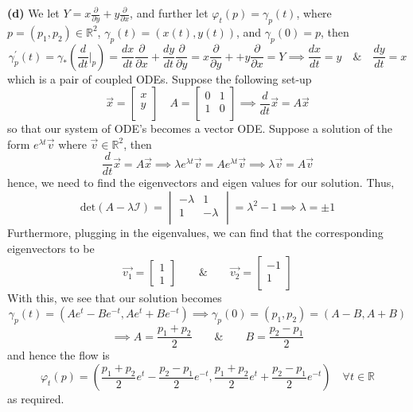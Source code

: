 \documentclass[10pt]{article}
\newcommand{\R}{\mathbb{R}}
\newcommand{\di}[2][]{\frac{\partial #1}{\partial #2}}
\newcommand{\del}[2][]{\frac{d #1}{d #2}}
\begin{document}
\textbf{(d)} We let $Y = x\di{y} + y\di{x}$, and further let $\varphi_{t}(p) = \gamma_{p}(t)$, where $p=(p_{1},p_{2})\in \R^{2}$, $\gamma_{p}(t) = (x(t),y(t))$, and $\gamma_{p}(0) = p$, then
\[ \gamma^{\prime}_{p}(t) = \gamma_{*}\left(\del{t}\bigg|_{p}\right) = \del[x]{t}\di{x} + \del[y]{t}\di{y} = x\di{y} + +y\di{x} = Y \implies \del[x]{t} = y \hspace{1em} \& \hspace{1em} \del[y]{t} = x \]
which is a pair of coupled ODEs. Suppose the following set-up
\[ \vec{x} = 
\begin{bmatrix}
  x \\
  y \\
\end{bmatrix}
\hspace{1em}
A =
\begin{bmatrix}
  0 & 1 \\
  1 & 0 \\
\end{bmatrix}
\implies \del{t}\vec{x} = A\vec{x}
\]
so that our system of ODE's becomes a vector ODE. Suppose a solution of the form $e^{\lambda t}\vec{v}$ where $\vec{v}\in \R^{2}$, then
\[ \del{t}\vec{x} = A\vec{x} \implies \lambda e^{\lambda t}\vec{v} = Ae^{\lambda t}\vec{v} \implies  \lambda \vec{v}= A\vec{v} \]
hence, we need to find the eigenvectors and eigen values for our solution. Thus,
\[ \text{det}(A - \lambda \mathcal{I}) =
\begin{vmatrix}
  -\lambda & 1 \\
  1 & -\lambda \\
\end{vmatrix}
= \lambda^{2} - 1 \implies \lambda = \pm 1 
\]
Furthermore, plugging in the eigenvalues, we can find that the corresponding eigenvectors to be
\[ \vec{v_{1}} = 
\begin{bmatrix}
  1 \\
  1
\end{bmatrix}
\hspace{2em} \& \hspace{2em} \vec{v_{2}} =
\begin{bmatrix}
  -1 \\
  1 \\
\end{bmatrix}
\]
With this, we see that our solution becomes
\[ \gamma_{p}(t) = (Ae^{t} - Be^{-t}, Ae^{t} + Be^{-t}) \implies \gamma_{p}(0) = (p_{1},p_{2}) = (A-B,A+B) \]
\[ \implies A = \frac{p_{1}+p_{2}}{2} \hspace{2em} \& \hspace{2em} B = \frac{p_{2} - p_{1}}{2} \]
and hence the flow is
\[ \varphi_{t}(p) = \left(\frac{p_{1}+p_{2}}{2}e^{t} - \frac{p_{2} - p_{1}}{2}e^{-t}, \frac{p_{1}+p_{2}}{2}e^{t} + \frac{p_{2} - p_{1}}{2}e^{-t}\right) \hspace{1em} \forall t\in \R\]
as required.
\end{document}
